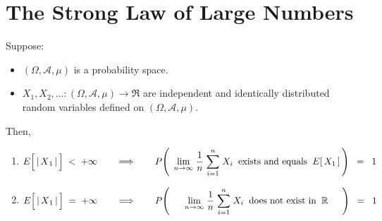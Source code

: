 

\section{The Strong Law of Large Numbers}
\setcounter{theorem}{0}
\setcounter{equation}{0}


\renewcommand{\theenumi}{\roman{enumi}}
\renewcommand{\labelenumi}{\textnormal{(\theenumi)}$\;\;$}


\begin{theorem}
\mbox{}\vskip 0.1cm
\noindent
Suppose:
\begin{itemize}
\item
	$(\Omega,\mathcal{A},\mu)$ is a probability space.
\item
	$X_{1}, X_{2}, \ldots : (\Omega,\mathcal{A},\mu) \longrightarrow \Re$ are
	independent and identically distributed random variables
	defined on $(\Omega,\mathcal{A},\mu)$.
\end{itemize}
Then,
\begin{enumerate}
\item
	\begin{equation*}
	E\!\left[\,\vert\,\overset{{\color{white}.}}{X}_{1}\,\vert\,\right] \;<\; +\infty
	\quad\quad\Longrightarrow\quad\quad
	P\!\left(\;\,
		\underset{n\rightarrow\infty}{\lim}\;
		\dfrac{1}{n}\;\overset{n}{\underset{i=1}{\sum}}\;X_{i}
		\;\;\textnormal{exists and equals}\;\;
		E[\,X_{1}\,]
		\,\right)
	\;\; = \;\; 1
	\end{equation*}
\item
	\begin{equation*}
	E\!\left[\,\vert\,\overset{{\color{white}.}}{X}_{1}\,\vert\,\right] \;=\; +\infty
	\quad\quad\Longrightarrow\quad\quad
	P\!\left(\;
		{\color{white}1...}
		\underset{n\rightarrow\infty}{\lim}\;
		\dfrac{1}{n}\;\overset{n}{\underset{i=1}{\sum}}\;X_{i}
		\;\;\textnormal{does not exist in}\;\; \Re
		{\color{white}1...}
		\,\right)
	\;\; = \;\; 1
	\end{equation*}
\end{enumerate}
\end{theorem}
\proof

